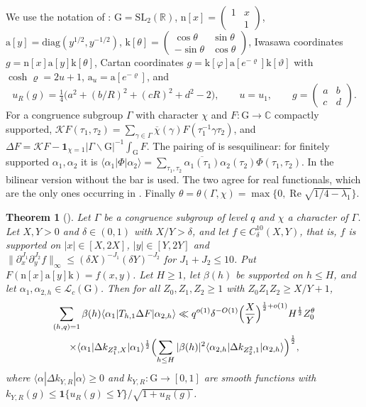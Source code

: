 \documentclass[11pt]{amsart}
\newtheorem{theorem}{Theorem}[section]
\theoremstyle{remark}
\theoremstyle{definition}
\numberwithin{equation}{section}
\newcommand{\R}{\mathbb{R}}
\newcommand{\C}{\mathbb{C}}
\newcommand{\G}{\mathrm{G}}
\newcommand{\SL}{\mathrm{SL}}
\newcommand{\one}{\mathbf{1}}
\newcommand{\br}[1]{\langle #1\rangle}
\newcommand{\Kc}{\mathcal{K}}
\newcommand{\ra}{\mathrm{a}}
\newcommand{\rn}{\mathrm{n}}
\newcommand{\rk}{\mathrm{k}}
\begin{document}
We use the notation of \cite{GM1}: $\G=\SL_2(\R)$, $\rn[x]=\left(\begin{smallmatrix}1&x\\&1\end{smallmatrix}\right)$, $\ra[y]=\mathrm{diag}(y^{1/2},y^{-1/2})$, $\rk[\theta]=\left(\begin{smallmatrix}\cos\theta&\sin\theta\\-\sin\theta&\cos\theta\end{smallmatrix}\right)$, Iwasawa coordinates $g=\rn[x]\ra[y]\rk[\theta]$, Cartan coordinates $g=\rk[\varphi]\ra[e^{-\varrho}]\rk[\vartheta]$ with $\cosh\varrho=2u+1$, $\ra_u=\ra[e^{-\varrho}]$, and
\[
u_R(g)=\tfrac14\bigl(a^2+(b/R)^2+(cR)^2+d^2-2\bigr),\qquad u=u_1,\qquad g=\left(\begin{smallmatrix}a&b\\c&d\end{smallmatrix}\right).
\]
For a congruence subgroup $\Gamma$ with character $\chi$ and $F:\G\to\C$ compactly supported, $\Kc F(\tau_1,\tau_2)=\sum_{\gamma\in\Gamma}\overline{\chi}(\gamma)F(\tau_1^{-1}\gamma\tau_2)$, and $\Delta F=\Kc F-\one_{\chi=1}|\Gamma\backslash\G|^{-1}\int_\G F$. The pairing of \cite[Definitions~1 and~4]{GM1} is sesquilinear: for finitely supported $\alpha_1,\alpha_2$ it is $\br{\alpha_1|\Phi|\alpha_2}=\sum_{\tau_1,\tau_2}\overline{\alpha_1(\tau_1)}\alpha_2(\tau_2)\Phi(\tau_1,\tau_2)$. In \cite{II} the bilinear version without the bar is used. The two agree for real functionals, which are the only ones occurring in \cite{II}. Finally $\theta=\theta(\Gamma,\chi)=\max\{0,\operatorname{Re}\sqrt{1/4-\lambda_1}\}$.

\begin{theorem}[{\cite[Theorem~8.1]{GM1}}]\label{thm:GM81}
Let $\Gamma$ be a congruence subgroup of level $q$ and $\chi$ a character of $\Gamma$. Let $X,Y>0$ and $\delta\in(0,1)$ with $X/Y>\delta$, and let $f\in C^{10}_\delta(X,Y)$, that is, $f$ is supported on $|x|\in[X,2X]$, $|y|\in[Y,2Y]$ and $\|\partial_x^{J_1}\partial_y^{J_2}f\|_\infty\le(\delta X)^{-J_1}(\delta Y)^{-J_2}$ for $J_1+J_2\le10$. Put $F(\rn[x]\ra[y]\rk)=f(x,y)$. Let $H\ge1$, let $\beta(h)$ be supported on $h\le H$, and let $\alpha_1,\alpha_{2,h}\in\mathcal L_c(\G)$. Then for all $Z_0,Z_1,Z_2\ge1$ with $Z_0Z_1Z_2\ge X/Y+1$,
\begin{multline*}
\sum_{(h,q)=1}\beta(h)\br{\alpha_1|T_{h,1}\Delta F|\alpha_{2,h}}\ll q^{o(1)}\delta^{-O(1)}\Bigl(\frac XY\Bigr)^{\frac12+o(1)}H^{\frac12}Z_0^\theta\\
\times\br{\alpha_1|\Delta k_{Z_1^2,X}|\alpha_1}^{\frac12}\Bigl(\sum_{h\le H}|\beta(h)|^2\br{\alpha_{2,h}|\Delta k_{Z_2^2,1}|\alpha_{2,h}}\Bigr)^{\frac12},
\end{multline*}
where $\br{\alpha|\Delta k_{Y,R}|\alpha}\ge0$ and $k_{Y,R}:\G\to[0,1]$ are smooth functions with $k_{Y,R}(g)\le\one\{u_R(g)\le Y\}/\sqrt{1+u_R(g)}$.
\end{theorem}
\end{document}

